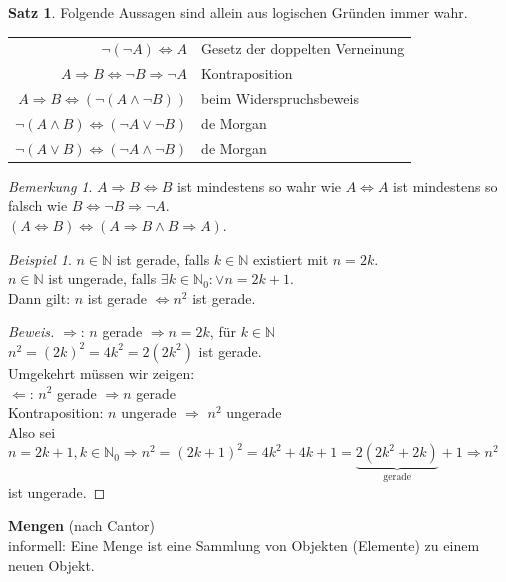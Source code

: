 \documentclass[12pt,a4paper,titlepage]{article} %
\theoremstyle{definition}
\newtheorem{satz}{Satz}[subsection]
\theoremstyle{remark}
\newtheorem*{bem}{Bemerkung}
\newtheorem*{bsp}{Beispiel}
\newenvironment{bew}{\begin{proof}[Beweis]}{\end{proof}}
\begin{document}
\begin{satz}
	Folgende Aussagen sind allein aus logischen Gründen immer wahr.
	\begin{tabular}{rl}
		$\neg(\neg A) \Leftrightarrow A$ & Gesetz der doppelten Verneinung\\
		$A \Rightarrow B \Leftrightarrow \neg B \Rightarrow \neg A$ & Kontraposition\\
		$A \Rightarrow B \Leftrightarrow (\neg (A \wedge \neg B))$ & beim Widerspruchsbeweis\\
		$\neg(A \wedge B) \Leftrightarrow (\neg A \vee \neg B)$ & de Morgan\\
		$\neg(A \vee B) \Leftrightarrow (\neg A \wedge \neg B)$ & de Morgan\\
	\end{tabular}
\end{satz}
\begin{bem}
	$A \Rightarrow B \Leftrightarrow B $ ist mindestens so wahr wie $A \Leftrightarrow A$ ist mindestens so falsch wie $B \Leftrightarrow \neg B \Rightarrow \neg A$.\\$(A\Leftrightarrow B) \Leftrightarrow (A \Rightarrow B \wedge B \Rightarrow A)$.
\end{bem}
\begin{bsp}
	$n \in \mathbb{N}$ ist gerade, falls $k \in \mathbb{N}$ existiert mit $n = 2k$.\\
	$n\in \mathbb{N}$ ist ungerade, falls $\exists k\in \mathbb{N}_0: \vee n = 2k+1$.\\
	Dann gilt: $n$ ist gerade $\Leftrightarrow n^2$ ist gerade.
	\begin{bew}
		\glqq $\Rightarrow$\grqq : $n$ gerade $\Rightarrow n=2k$, für $k\in \mathbb{N}$\\
		$n^2 = (2k)^2 = 4k^2 = 2(2k^2)$ ist gerade.\\
		Umgekehrt müssen wir zeigen:\\
		\glqq $\Leftarrow$\grqq : $n^2$ gerade $\Rightarrow n$ gerade\\
		Kontraposition: $n$ ungerade $\Rightarrow$ $n^2$ ungerade\\
		Also sei $n = 2k+1, k \in \mathbb{N}_0 \Rightarrow n^2 = (2k+1)^2 = 4k^2 + 4k + 1 = \underbrace{2(2k^2 + 2k)}_{\text{gerade}} + 1 \Rightarrow n^2$ ist ungerade. 
	\end{bew}
\end{bsp} 
\textbf{Mengen} (nach Cantor)\\
informell: Eine Menge ist eine Sammlung von Objekten (Elemente) zu einem neuen Objekt.\\
\end{document}
